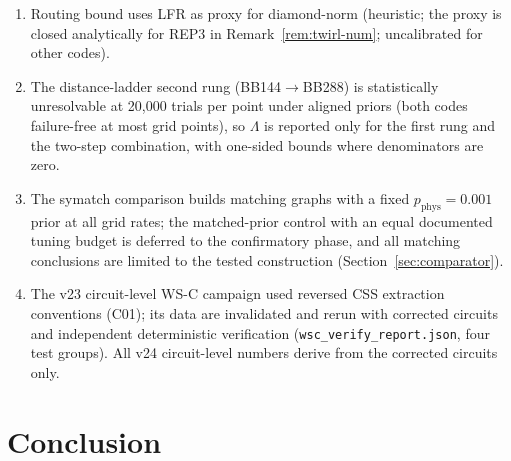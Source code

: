 \documentclass[11pt,a4paper]{article}
\begin{document}
\begin{enumerate}[leftmargin=1.4em]
    cluster shots within 50 pinned patterns per cell; and the
    weight-$(t{+}1)$ arms saturate at $90$--$98\%$ rather than $100\%$
    owing to native-noise rescue events. Corollary~\ref{cor:css} covers general CSS memories under
    the spacetime fault model with exact minimum-weight decoding
    (Remark~\ref{rem:decoder-inst} delineates which conclusions
    implemented decoders inherit); a
    circuit-level spacetime-distance proof for BB memories with hook
    errors (beyond the certified single-round $t=2$) is open. The
    repetition-code campaigns
    validate the bound structure and the calibration-to-model
    methodology; quantitative transfer of REP-calibrated noise models
    to BB-hardware performance predictions is not claimed and would
    require a separate BB-device modelling argument.
  \item Routing bound uses LFR as proxy for diamond-norm (heuristic;
    the proxy is closed analytically for REP3 in
    Remark~\ref{rem:twirl-num}; uncalibrated for other codes).
  \item The distance-ladder second rung (BB144$\to$BB288) is
    statistically unresolvable at 20{,}000 trials per point under
    aligned priors (both codes failure-free at most grid points), so
    $\Lambda$ is reported only for the first rung and the two-step
    combination, with one-sided bounds where denominators are zero.
  \item The symatch comparison builds matching graphs with a fixed
    $p_{\mathrm{phys}}=0.001$ prior at all grid rates; the
    matched-prior control with an equal documented tuning budget is
    deferred to the confirmatory phase, and all matching conclusions
    are limited to the tested construction
    (Section~\ref{sec:comparator}).
  \item The v23 circuit-level WS-C campaign used reversed CSS
    extraction conventions (C01); its data are invalidated and rerun
    with corrected circuits and independent deterministic verification
    (\texttt{wsc\_verify\_report.json}, four test groups). All v24
    circuit-level numbers derive from the corrected circuits only.
\end{enumerate}

\section{Conclusion}
\end{document}
